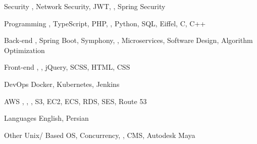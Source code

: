 

\begin{cvskills}

\cvskill
  {Security} %
  {, Network Security, JWT, , Spring Security} %

\cvskill
  {Programming} %
  {, TypeScript, PHP, , Python, SQL, Eiffel, C, C++} %

\cvskill
  {Back-end} %
  {, Spring Boot, Symphony, , Microservices, Software Design, Algorithm Optimization} %

\cvskill
  {Front-end} %
  {, , jQuery, SCSS, HTML, CSS} %

\cvskill
  {DevOps} %
  {Docker, Kubernetes, Jenkins} %

\cvskill
  {AWS} %
  {, , , S3, EC2, ECS, RDS, SES, Route 53} %

\cvskill
  {Languages} %
  {English, Persian} %

\cvskill
  {Other} %
  {Unix/ Based OS, Concurrency, , CMS, Autodesk Maya} %

\end{cvskills}
